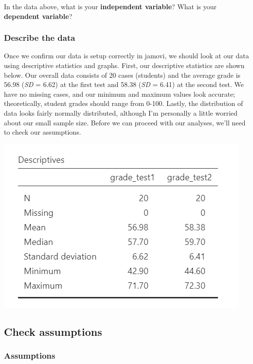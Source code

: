 \documentclass[
]{book}
\begin{document}
In the data above, what is your \textbf{independent variable}? What is your \textbf{dependent variable}?

\hypertarget{describe-the-data-2}{%
\subsubsection{Describe the data}\label{describe-the-data-2}}

Once we confirm our data is setup correctly in jamovi, we should look at our data using descriptive statistics and graphs. First, our descriptive statistics are shown below. Our overall data consists of 20 cases (students) and the average grade is 56.98 (\emph{SD} = 6.62) at the first test and 58.38 (\emph{SD} = 6.41) at the second test. We have no missing cases, and our minimum and maximum values look accurate; theoretically, student grades should range from 0-100. Lastly, the distribution of data looks fairly normally distributed, although I'm personally a little worried about our small sample size. Before we can proceed with our analyses, we'll need to check our assumptions.

\includegraphics{images/03_dependent_t-test/dependent_descriptives.png}

\hypertarget{check-assumptions-2}{%
\subsection{Check assumptions}\label{check-assumptions-2}}

\hypertarget{assumptions-2}{%
\subsubsection{Assumptions}\label{assumptions-2}}
\end{document}

